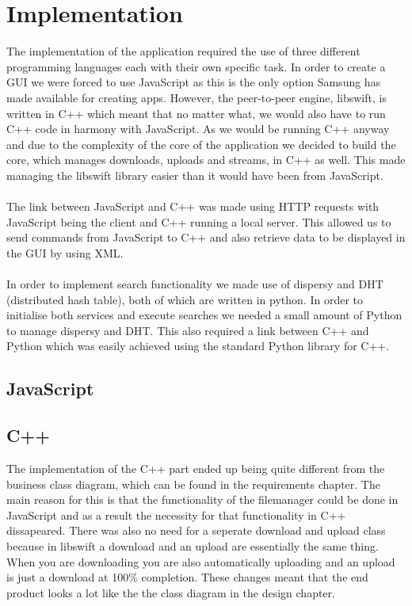 \chapter{Implementation}

The implementation of the application required the use of three different programming languages each with their own specific task. In order to create a GUI we were forced to use JavaScript as this is the only option Samsung has made available for creating apps. However, the peer-to-peer engine, libswift, is written in C++ which meant that no matter what, we would also have to run C++ code in harmony with JavaScript. As we would be running C++ anyway and due to the complexity of the core of the application we decided to build the core, which manages downloads, uploads and streams, in C++ as well. This made managing the libswift library easier than it would have been from JavaScript.
\\\\
The link between JavaScript and C++ was made using HTTP requests with JavaScript being the client  and C++ running a local server. This allowed us to send commands from JavaScript to C++ and also retrieve data to be displayed in the GUI by using XML.
\\\\
In order to implement search functionality we made use of dispersy and DHT (distributed hash table), both of which are written in python. In order to initialise both services and execute searches we needed a small amount of Python to manage dispersy and DHT. This also required a link between C++ and Python which was easily achieved using the standard Python library for C++.

\section{JavaScript}

\section{C++}

The implementation of the C++ part ended up being quite different from the business class diagram, which can be found in the requirements chapter. The main reason for this is that the functionality of the filemanager could be done in JavaScript and as a result the necessity for that functionality in C++ dissapeared. There was also no need for a seperate download and upload class because in libswift a download and an upload are essentially the same thing. When you are downloading you are also automatically uploading and an upload is just a download at 100\% completion. These changes meant that the end product looks a lot like the the class diagram in the design chapter.

